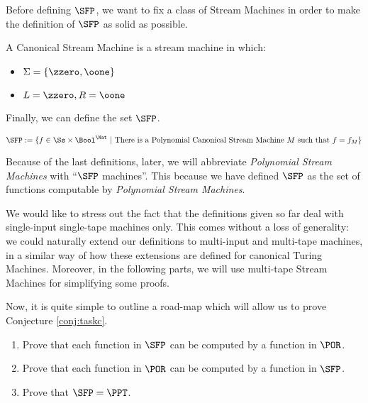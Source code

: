 \begin{conditional}{\notappendix}
    Before defining $\SFP$, we want to
    fix a class of Stream Machines in order to
    make the definition of $\SFP$ as solid as possible.

    \begin{defn}
      A Canonical Stream Machine is a stream machine in which:
      \begin{itemize}
        \item $\Sigma =\{\zzero, \oone\}$
        \item $L = \zzero, R = \oone$
      \end{itemize}
    \end{defn}


    Finally, we can define the set $\SFP$.

    \begin{defn}[$\SFP$]
      \label{def:sfp}
      \[
      \SFP := \{ f \in \Ss \times \Bool^\Nat~|~ \text{There is a Polynomial Canonical Stream
      Machine $M$ such that }f=f_M\}
      \]
      \normalsize
    \end{defn}

    Because of the last definitions, later, we will abbreviate
    \emph{Polynomial Stream Machines} with ``$\SFP$ machines''.
    This because we have defined $\SFP$ as the set of
    functions computable by \emph{Polynomial Stream Machines}.

    We would like to stress out the fact that the definitions given so far
    deal with single-input
    single-tape machines only. This comes without a loss of generality:
    we could naturally extend our
    definitions to multi-input and multi-tape machines, in a similar way of how
    these extensions are defined for canonical Turing Machines.
    Moreover, in the following parts, we will use multi-tape Stream Machines for
    simplifying some proofs.

    Now, it is quite simple to outline a road-map which will allow us to prove
    Conjecture \ref{conj:taskc}.

    \begin{enumerate}
      \item Prove that each function in $\SFP$ can be computed by a function in $\POR$.
      \item Prove that each function in $\POR$ can be computed by a function in $\SFP$.
      \item Prove that $\SFP=\PPT$.
    \end{enumerate}


\begin{comment}
    \noindent
    The desired result can be now stated as:



\end{comment}
\end{conditional}
